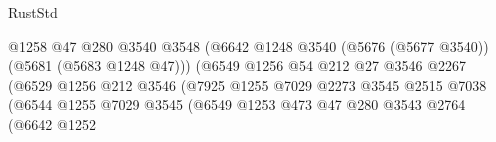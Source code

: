 \begin{lexlean}{RustStd}
\begin{coremodule}
                                                    @1258
                                                    @47
                                                    @280
                                                    @3540
                                                    @3548
                                                    (@6642
                                                      @1248
                                                      @3540
                                                      (@5676 (@5677 @3540))
                                                      (@5681 (@5683 @1248 @47)))
                                                    (@6549
                                                      @1256
                                                      @54
                                                      @212
                                                      @27
                                                      @3546
                                                      @2267
                                                      (@6529
                                                        @1256
                                                        @212
                                                        @3546
                                                        (@7925
                                                          @1255
                                                          @7029
                                                          @2273
                                                          @3545
                                                          @2515
                                                          @7038
                                                          (@6544
                                                            @1255
                                                            @7029
                                                            @3545
                                                            (@6549
                                                              @1253
                                                              @473
                                                              @47
                                                              @280
                                                              @3543
                                                              @2764
                                                              (@6642
                                                                @1252

\end{coremodule}
\end{lexlean}
